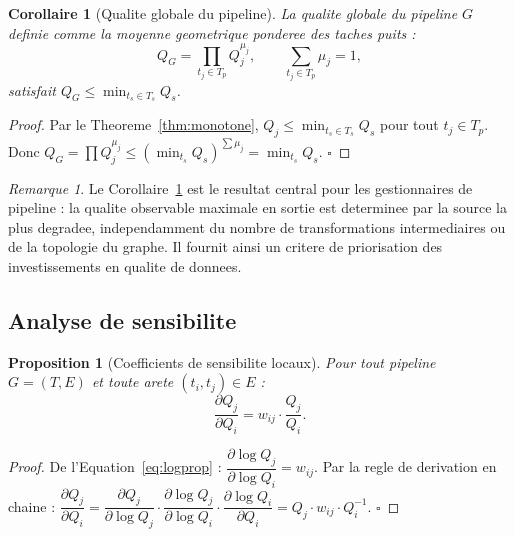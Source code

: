 \documentclass[12pt,a4paper]{article}
\theoremstyle{plain}
\newtheorem{proposition}[theorem]{Proposition}
\newtheorem{corollary}[theorem]{Corollaire}
\theoremstyle{definition}
\theoremstyle{remark}
\newtheorem{remark}[theorem]{Remarque}
\begin{document}
\begin{corollary}[Qualite globale du pipeline]
\label{cor:global}
La qualite globale du pipeline $G$ definie comme la moyenne geometrique
ponderee des taches puits :
\begin{equation}
Q_G = \prod_{t_j \in T_p} Q_j^{\mu_j},
\qquad \sum_{t_j\in T_p}\mu_j = 1,
\label{eq:qglobal}
\end{equation}
satisfait $Q_G \leq \min_{t_s \in T_s} Q_s$.
\end{corollary}

\begin{proof}
Par le Theoreme~\ref{thm:monotone}, $Q_j \leq \min_{t_s\in T_s} Q_s$
pour tout $t_j \in T_p$. Donc
$Q_G = \prod Q_j^{\mu_j} \leq (\min_{t_s}Q_s)^{\sum\mu_j}
= \min_{t_s}Q_s$. \hfill$\square$
\end{proof}

\begin{remark}
Le Corollaire~\ref{cor:global} est le resultat central pour les
gestionnaires de pipeline : la qualite observable maximale en sortie
est determinee par la source la plus degradee, independamment du nombre
de transformations intermediaires ou de la topologie du graphe.
Il fournit ainsi un critere de priorisation des investissements en
qualite de donnees.
\end{remark}

\subsection{Analyse de sensibilite}
\label{subsec:sensitivity}

\begin{proposition}[Coefficients de sensibilite locaux]
\label{prop:sensitivity}
Pour tout pipeline $G=(T,E)$ et toute arete $(t_i,t_j) \in E$ :
\begin{equation}
\frac{\partial Q_j}{\partial Q_i} = w_{ij} \cdot \frac{Q_j}{Q_i}.
\label{eq:sens_local}
\end{equation}
\end{proposition}

\begin{proof}
De l'Equation~\eqref{eq:logprop} :
$\dfrac{\partial \log Q_j}{\partial \log Q_i} = w_{ij}$.
Par la regle de derivation en chaine :
$\dfrac{\partial Q_j}{\partial Q_i}
= \dfrac{\partial Q_j}{\partial \log Q_j}
  \cdot \dfrac{\partial \log Q_j}{\partial \log Q_i}
  \cdot \dfrac{\partial \log Q_i}{\partial Q_i}
= Q_j \cdot w_{ij} \cdot Q_i^{-1}$.
\hfill$\square$
\end{proof}
\end{document}

